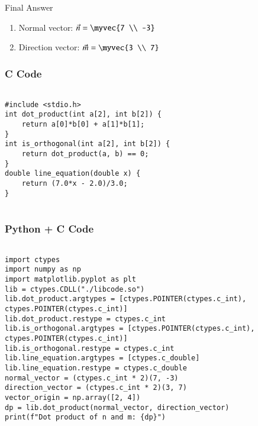 \documentclass{beamer}
\begin{document}
\begin{frame}{Final Answer}
\begin{enumerate}
    \item Normal vector: $\vec{n} = \myvec{7 \\ -3}$
    \item Direction vector: $\vec{m} = \myvec{3 \\ 7}$
\end{enumerate}
\end{frame}

\begin{frame}[fragile]
    \frametitle{C Code }

    \begin{lstlisting}

#include <stdio.h>
int dot_product(int a[2], int b[2]) {
    return a[0]*b[0] + a[1]*b[1];
}
int is_orthogonal(int a[2], int b[2]) {
    return dot_product(a, b) == 0;
}
double line_equation(double x) {
    return (7.0*x - 2.0)/3.0;
}


    \end{lstlisting}
\end{frame}

\begin{frame}[fragile]
    \frametitle{Python + C Code }

    \begin{lstlisting}

import ctypes
import numpy as np
import matplotlib.pyplot as plt
lib = ctypes.CDLL("./libcode.so")
lib.dot_product.argtypes = [ctypes.POINTER(ctypes.c_int), ctypes.POINTER(ctypes.c_int)]
lib.dot_product.restype = ctypes.c_int
lib.is_orthogonal.argtypes = [ctypes.POINTER(ctypes.c_int), ctypes.POINTER(ctypes.c_int)]
lib.is_orthogonal.restype = ctypes.c_int
lib.line_equation.argtypes = [ctypes.c_double]
lib.line_equation.restype = ctypes.c_double
normal_vector = (ctypes.c_int * 2)(7, -3)
direction_vector = (ctypes.c_int * 2)(3, 7)
vector_origin = np.array([2, 4])
dp = lib.dot_product(normal_vector, direction_vector)
print(f"Dot product of n and m: {dp}")



    \end{lstlisting}
\end{frame}
\end{document}
